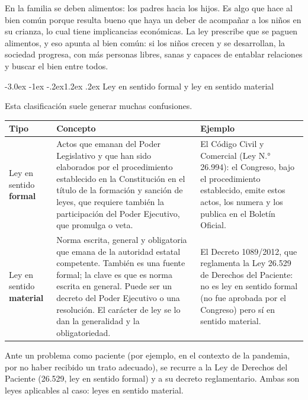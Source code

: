 \documentclass[12pt,oneside]{book}
\makeatletter
\renewcommand\section{\@startsection{section}{1}{\z@}%
  {-3.0ex \@plus -1ex \@minus -.2ex}{1.2ex \@plus .2ex}%
  {\normalfont\large\bfseries\color{acento}}}
\makeatother
\begin{document}
\begin{ejemplo}
En la familia se deben alimentos: los padres hacia los hijos. Es algo que hace al bien común porque resulta bueno que haya un deber de acompañar a los niños en su crianza, lo cual tiene implicancias económicas. La ley prescribe que se paguen alimentos, y eso apunta al bien común: si los niños crecen y se desarrollan, la sociedad progresa, con más personas libres, sanas y capaces de entablar relaciones y buscar el bien entre todos.
\end{ejemplo}

\section{Ley en sentido formal y ley en sentido material}

Esta clasificación suele generar muchas confusiones.

\begin{table}[H]
\centering
\begin{tabularx}{\textwidth}{>{\raggedright\arraybackslash}p{} >{\raggedright\arraybackslash}X >{\raggedright\arraybackslash}p{}}
\toprule
\textbf{Tipo} & \textbf{Concepto} & \textbf{Ejemplo} \\
\midrule
Ley en sentido \textbf{formal} &
Actos que emanan del Poder Legislativo y que han sido elaborados por el procedimiento establecido en la Constitución en el título de la formación y sanción de leyes, que requiere también la participación del Poder Ejecutivo, que promulga o veta. &
El Código Civil y Comercial (Ley N.° 26.994): el Congreso, bajo el procedimiento establecido, emite estos actos, los numera y los publica en el Boletín Oficial. \\
\addlinespace
Ley en sentido \textbf{material} &
Norma escrita, general y obligatoria que emana de la autoridad estatal competente. También es una fuente formal; la clave es que es norma escrita en general. Puede ser un decreto del Poder Ejecutivo o una resolución. El carácter de ley se lo dan la generalidad y la obligatoriedad. &
El Decreto 1089/2012, que reglamenta la Ley 26.529 de Derechos del Paciente: no es ley en sentido formal (no fue aprobada por el Congreso) pero sí en sentido material. \\
\bottomrule
\end{tabularx}
\end{table}

\begin{ejemplo}
Ante un problema como paciente (por ejemplo, en el contexto de la pandemia, por no haber recibido un trato adecuado), se recurre a la Ley de Derechos del Paciente (26.529, ley en sentido formal) y a su decreto reglamentario. Ambas son leyes aplicables al caso: leyes en sentido material.
\end{ejemplo}
\end{document}
